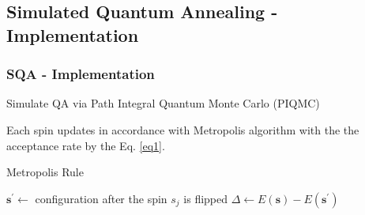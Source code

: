 \documentclass[11pt,compress,mathserif]{beamer}
\begin{document}

\subsection[Implementation]{Simulated Quantum Annealing - Implementation}
\begin{frame}\frametitle{SQA - Implementation}

\bit
\item Simulate QA via Path Integral Quantum Monte Carlo (PIQMC) \cite{santoro2002theory, suzuki1977monte} 

\item Each spin updates in accordance with Metropolis algorithm \cite{metropolis1953equation} with the the acceptance rate by the Eq. \eqref{eq1}.

\eit

\begin{algorithm}[H]
\scriptsize
\caption{Metropolis Rule}
\begin{algorithmic}
\State $\mathbf{s}^{\prime} \leftarrow$ configuration after the spin $s_{j}$ is flipped
\State $\Delta \leftarrow E(\mathbf{s}) - E\left(\mathbf{s}^{\prime}\right)$
\State {}
\Else
\State {}
\EndFunction
\end{algorithmic}
\label{alg:metropolis}
\end{algorithm}

\end{frame}

\end{document}
